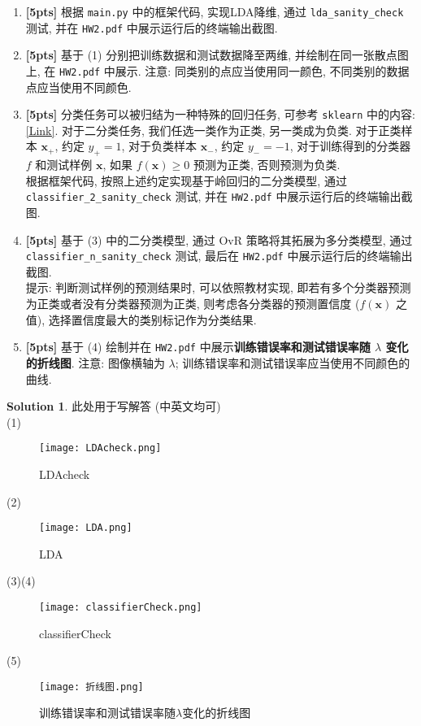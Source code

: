 \documentclass[a4paper]{article}
\numberwithin{equation}{section}
\theoremstyle{definition}
\newtheorem*{solution}{Solution}
\def \x {\bm{x}}
\begin{document}
\begin{enumerate}
	\item[(1)] \textbf{[5pts]} 根据 \texttt{main.py} 中的框架代码, 实现LDA降维, 通过 \texttt{lda\_sanity\_check} 测试, 并在 \texttt{HW2.pdf} 中展示运行后的终端输出截图.
	\item[(2)] \textbf{[5pts]} 基于 (1) 分别把训练数据和测试数据降至两维, 并绘制在同一张散点图上, 在 \texttt{HW2.pdf} 中展示. 注意: 同类别的点应当使用同一颜色, 不同类别的数据点应当使用不同颜色.
	\item[(3)] \textbf{[5pts]} 分类任务可以被归结为一种特殊的回归任务, 可参考 \texttt{sklearn} 中的内容: \href{https://scikit-learn.org/stable/modules/linear_model.html#classification}{[Link]}. 对于二分类任务, 我们任选一类作为正类, 另一类成为负类. 对于正类样本 $\x_+$, 约定 $y_+ = 1$, 对于负类样本 $\x_-$, 约定 $y_- = -1$, 对于训练得到的分类器 $f$ 和测试样例 $\x$, 如果 $f(\x) \geqslant 0$ 预测为正类, 否则预测为负类. \\根据框架代码, 按照上述约定实现基于岭回归的二分类模型, 通过\\ \texttt{classifier\_2\_sanity\_check} 测试, 并在 \texttt{HW2.pdf} 中展示运行后的终端输出截图.
	\item[(4)] \textbf{[5pts]} 基于 (3) 中的二分类模型, 通过 OvR 策略将其拓展为多分类模型, 通过\\ \texttt{classifier\_n\_sanity\_check} 测试, 最后在 \texttt{HW2.pdf} 中展示运行后的终端输出截图.\\提示: 判断测试样例的预测结果时, 可以依照教材实现, 即若有多个分类器预测为正类或者没有分类器预测为正类, 则考虑各分类器的预测置信度 ($f(\x)$ 之值), 选择置信度最大的类别标记作为分类结果.
	\item[(5)] \textbf{[5pts]} 基于 (4) 绘制并在 \texttt{HW2.pdf} 中展示\textbf{训练错误率和测试错误率随 $\lambda$ 变化的折线图}. 注意: 图像横轴为 $\lambda$; 训练错误率和测试错误率应当使用不同颜色的曲线.
\end{enumerate}

\begin{solution}
	此处用于写解答 (中英文均可)\\
 (1)
  \begin{figure}[H]
    \centering
    \texttt{[image: LDAcheck.png]}\\
    \caption{LDAcheck}
    \label{fig:roc}
\end{figure}
 (2)
 \begin{figure}[H]
    \centering
    \texttt{[image: LDA.png]}\\
    \caption{LDA}
    \label{fig:roc}
\end{figure}
(3)(4)
 \begin{figure}[H]
    \centering
    \texttt{[image: classifierCheck.png]}\\
    \caption{classifierCheck}
    \label{fig:roc}
\end{figure}
(5)
 \begin{figure}[H]
    \centering
    \texttt{[image: 折线图.png]}\\
    \caption{训练错误率和测试错误率随$\lambda$变化的折线图}
    \label{fig:roc}
\end{figure}
\end{solution}
\end{document}
